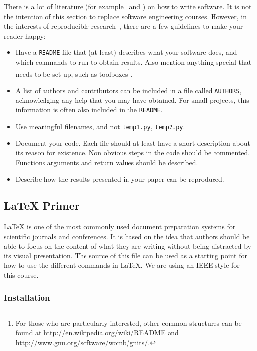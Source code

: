 \documentclass[10pt,conference,compsocconf]{IEEEtran}
\begin{document}
	There is a lot of literature (for example~\cite{hunt99pragmatic} and
	\cite{spolsky04software}) on how to write software. It is not the
	intention of this section to replace software engineering
	courses. However, in the interests of reproducible
	research~\cite{schwab00}, there are a few guidelines to make your
	reader happy:
	\begin{itemize}
		\item Have a \texttt{README} file that (at least) describes what your
		software does, and which commands to run to obtain results. Also
		mention anything special that needs to be set up, such as
		toolboxes\footnote{For those who are
			particularly interested, other common structures can be found at
			\url{http://en.wikipedia.org/wiki/README} and
			\url{http://www.gnu.org/software/womb/gnits/}.}.
		\item A list of authors and contributors can be included in a file
		called \texttt{AUTHORS}, acknowledging any help that you may have
		obtained. For small projects, this information is often also
		included in the \texttt{README}.
		\item Use meaningful filenames, and not \texttt{temp1.py},
		\texttt{temp2.py}. 
		\item Document your code. Each file should at least have a short
		description about its reason for existence. Non obvious steps in the
		code should be commented. Functions arguments and return values should be described.
		\item Describe how the results presented in your paper can be reproduced.
	\end{itemize}
	
	
	\subsection{\LaTeX{} Primer}
	\label{sec:latex-primer}
	
	\LaTeX{} is one of the most commonly used document preparation systems
	for scientific journals and conferences. It is based on the idea
	that authors should be able to focus on the content of what they are
	writing without being distracted by its visual presentation.
	The source of this file can be used as a starting point for how to use
	the different commands in \LaTeX{}. We are using an IEEE style for
	this course.
	
	\subsubsection{Installation}
	
\end{document}
